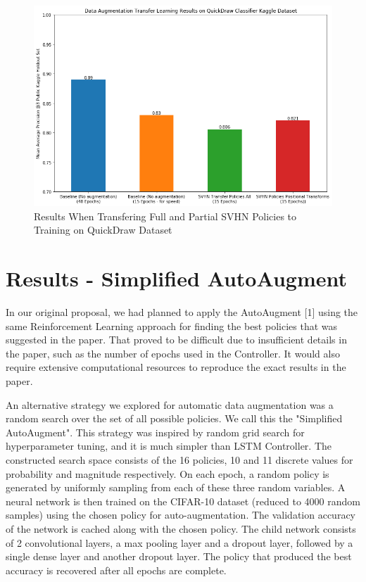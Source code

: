 \documentclass[10pt,twocolumn,letterpaper]{article}
\begin{document}
\begin{figure}[bhp]
\includegraphics[width=\columnwidth]{quickdraw_results.png}
\caption{Results When Transfering Full and Partial SVHN Policies to Training on QuickDraw Dataset}
\end{figure}

\section{Results - Simplified AutoAugment}


In our original proposal, we had planned to apply the AutoAugment [1] using the same Reinforcement Learning approach for finding the best policies that was suggested in the paper.  That proved to be difficult due to insufficient details in the paper, such as the number of epochs used in the Controller.  It would also require extensive computational resources to reproduce the exact results in the paper.

An alternative strategy we explored for automatic data augmentation was a random search over the set of all possible policies. We call this the "Simplified AutoAugment".  This strategy was inspired by random grid search for hyperparameter tuning, and it is much simpler than LSTM Controller. The constructed search space consists of the 16 policies, 10 and 11 discrete values for probability and magnitude respectively. On each epoch, a random policy is generated by uniformly sampling from each of these three random variables. A neural network is then trained on the CIFAR-10 dataset (reduced to 4000 random samples) using the chosen policy for auto-augmentation. The validation accuracy of the network is cached along with the chosen policy. The child network consists of 2 convolutional layers, a max pooling layer and a dropout layer, followed by a single dense layer and another dropout layer. The policy that produced the best accuracy is recovered after all epochs are complete.
\end{document}
